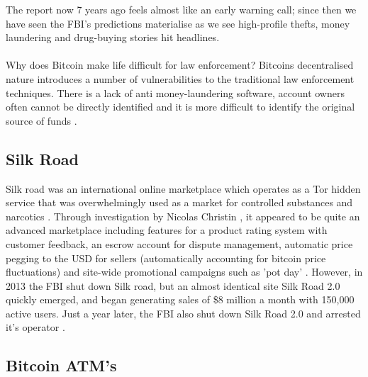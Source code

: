 The report now 7 years ago feels almost like an early warning call; since then we have seen the FBI's predictions materialise as we see high-profile thefts, money laundering and drug-buying stories hit headlines. 
\\\\
Why does Bitcoin make life difficult for law enforcement? Bitcoins decentralised nature introduces a number of vulnerabilities to the traditional law enforcement techniques. There is a lack of anti money-laundering software, account owners often cannot be directly identified and it is more difficult to identify the original source of funds \cite{RefWorks:doc:5c4ad055e4b0ea619646c15a}. 

\subsection{Silk Road}
Silk road was an international online marketplace which operates as a Tor hidden service that was overwhelmingly used as a market for controlled substances and narcotics \cite{RefWorks:doc:5c3e0105e4b0854ae612621e}. Through investigation by Nicolas Christin \cite{RefWorks:doc:5c3e0105e4b0854ae612621e}, it appeared to be quite an advanced marketplace including features for a product rating system with customer feedback, an escrow account for dispute management, automatic price pegging to the USD for sellers (automatically accounting for bitcoin price fluctuations) and site-wide promotional campaigns such as 'pot day' \cite{RefWorks:doc:5c3e0105e4b0854ae612621e}. However, in 2013 the FBI shut down Silk road, but an almost identical site Silk Road 2.0 quickly emerged, and began generating sales of \$8 million a month with 150,000 active users. Just a year later, the FBI also shut down Silk Road 2.0 and arrested it's operator \cite{RefWorks:doc:5c4ae400e4b0613d0cdbb201}. 

\subsection{Bitcoin ATM's}

